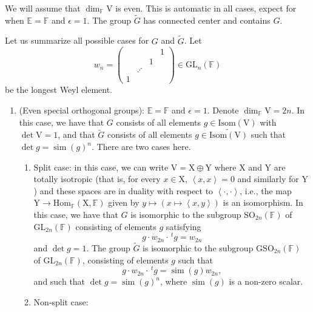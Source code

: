 \documentclass[12pt, reqno]{amsart}
\theoremstyle{definition}
\theoremstyle{definition}
\theoremstyle{definition}
\newcommand{\Hom}{\mathrm{Hom}}
\newcommand{\hermitianSpace}{\mathrm{V}}
\newcommand{\xIsotropic}{\mathrm{X}}
\newcommand{\yIsotropic}{\mathrm{Y}}
\newcommand{\similitudeCharacter}{\operatorname{sim}}
\newcommand{\innerproduct}[2]{\left\langle #1,#2\right\rangle}
\newcommand{\transpose}[1]{\, {}^{t}#1}
\newcommand{\GL}{\mathrm{GL}}
\newcommand{\SO}{\mathrm{SO}}
\newcommand{\GSO}{\mathrm{GSO}}
\newcommand{\GroupExtension}[1]{\widetilde{#1}}
\newcommand{\finiteField}{\mathbb{F}}
\newcommand{\quadraticExtension}{\mathbb{E}}
\newcommand{\IsometryGroup}{\mathrm{Isom}}
\begin{document}
We will assume that $\dim_{\finiteField} \hermitianSpace$ is even. This is automatic in all cases, expect for when $\quadraticExtension = \finiteField$ and $\epsilon = 1$. The group $\GroupExtension{G}$ has connected center and contains $G$.

Let us summarize all possible cases for $G$ and $\GroupExtension{G}$. Let $$w_n = \begin{pmatrix}
	& & & 1\\
	& & 1\\
	& \iddots\\
	1
\end{pmatrix} \in \GL_n\left(\finiteField\right)$$ be the longest Weyl element.
\begin{enumerate}
	\item (Even special orthogonal groups): $\quadraticExtension = \finiteField$ and $\epsilon = 1$. Denote $\dim_{\finiteField} \hermitianSpace = 2n$. In this case, we have that $G$ consists of all elements $g \in \IsometryGroup\left(\hermitianSpace\right)$ with $\det \hermitianSpace = 1$, and that $\GroupExtension{G}$ consists of all elements $g \in \GroupExtension{\IsometryGroup\left(\hermitianSpace\right)}$ such that $\det g = \similitudeCharacter\left(g\right)^n$. There are two cases here.
	\begin{enumerate}
		\item Split case: in this case, we can write $\hermitianSpace = \xIsotropic \oplus \yIsotropic$ where $\xIsotropic$ and $\yIsotropic$ are totally isotropic (that is, for every $x \in \xIsotropic$, $\innerproduct{x}{x} = 0$ and similarly for $\yIsotropic$) and these spaces are in duality with respect to $\innerproduct{\cdot}{\cdot}$, i.e., the map $\yIsotropic \to \Hom_{\finiteField}\left(\xIsotropic, \finiteField\right)$ given by $y \mapsto \left(x \mapsto \innerproduct{x}{y}\right)$ is an isomorphism. In this case, we have that $G$ is isomorphic to the subgroup $\SO_{2n}\left(\finiteField\right)$ of $\GL_{2n}\left(\finiteField\right)$ consisting of elements $g$ satisfying $$g \cdot w_{2n} \cdot \transpose{g} = w_{2n}$$ and $\det g = 1$.
		The group $\tilde{G}$ is isomorphic to the subgroup $\GSO_{2n}\left(\finiteField\right)$ of $\GL_{2n}\left(\finiteField\right)$, consisting of elements $g$ such that $$g \cdot w_{2n} \cdot \transpose{g} = \similitudeCharacter\left(g\right) w_{2n},$$
		and such that $\det g = \similitudeCharacter\left(g\right)^n$, where $\similitudeCharacter\left(g\right)$ is a non-zero scalar.
		\item Non-split case:
	\end{enumerate}

\end{enumerate}
\end{document}
